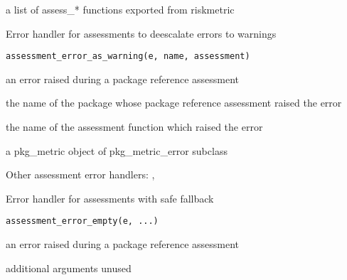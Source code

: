 \documentclass[a4paper]{book}
\begin{document}
%
\begin{Value}
a list of assess\_* functions exported from riskmetric
\end{Value}
%
\begin{Description}
Error handler for assessments to deescalate errors to warnings
\end{Description}
%
\begin{Usage}
\begin{verbatim}
assessment_error_as_warning(e, name, assessment)
\end{verbatim}
\end{Usage}
%
\begin{Arguments}
\begin{ldescription}
\item[\code{e}] an error raised during a package reference assessment

\item[\code{name}] the name of the package whose package reference assessment raised
the error

\item[\code{assessment}] the name of the assessment function which raised the error
\end{ldescription}
\end{Arguments}
%
\begin{Value}
a pkg\_metric object of pkg\_metric\_error subclass
\end{Value}
%
\begin{SeeAlso}
Other assessment error handlers: 
,
\end{SeeAlso}
%
\begin{Description}
Error handler for assessments with safe fallback
\end{Description}
%
\begin{Usage}
\begin{verbatim}
assessment_error_empty(e, ...)
\end{verbatim}
\end{Usage}
%
\begin{Arguments}
\begin{ldescription}
\item[\code{e}] an error raised during a package reference assessment

\item[\code{...}] additional arguments unused
\end{ldescription}
\end{Arguments}
\end{document}
